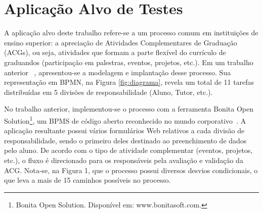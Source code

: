 \documentclass[12pt]{article}
\begin{document}








\section{Aplicação Alvo de Testes}

A aplicação alvo deste trabalho refere-se a um processo comum em instituições de ensino superior: a apreciação de Atividades Complementares de Graduação (ACGs), ou seja, atividades que formam a parte flexível do currículo de graduandos (participação em palestras, eventos, projetos, etc.). Em um trabalho anterior ~\cite{sbsi2013}, apresentou-se a modelagem e implantação desse processo. Sua representação em BPMN, na Figura \ref{fig:diagrama}, revela um total de 11 tarefas distribuídas em 5 divisões de responsabilidade (Aluno, Tutor, etc.).

No trabalho anterior, implementou-se o processo com a ferramenta Bonita Open Solution\footnote{Bonita Open Solution. Disponível em: www.bonitasoft.com.}, um BPMS de código aberto reconhecido no mundo corporativo~\cite{gartner, forrester}. A aplicação resultante possui vários formulários Web relativos a cada divisão de responsabilidade, sendo o primeiro deles destinado ao preenchimento de dados pelo aluno. De acordo com o tipo de atividade complementar (eventos, projetos, etc.), o fluxo é direcionado para os responsáveis pela avaliação e validação da ACG. Nota-se, na Figura 1, que o processo possui diversos desvios condicionais, o que leva a mais de 15 caminhos possíveis no processo.
\end{document}
